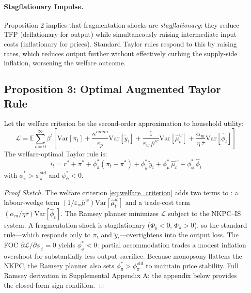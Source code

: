 \paragraph{Stagflationary Impulse.}
Proposition 2 implies that fragmentation shocks are \emph{stagflationary}: they
reduce TFP (deflationary for output) while simultaneously raising intermediate
input costs (inflationary for prices). Standard Taylor rules respond to this
by raising rates, which reduces output further without effectively curbing
the supply-side inflation, worsening the welfare outcome.

\subsection{Proposition 3: Optimal Augmented Taylor Rule}

\begin{theorem}
  \label{thm:optimal_rule}
  Let the welfare criterion be the second-order approximation to household
  utility:
  \begin{equation}
    \mathcal{L} = \mathbb{E}\sum_{t=0}^\infty\beta^t\left[
    \mathrm{Var}[\pi_t] + \frac{\kappa^{mono}}{\varepsilon_p}\mathrm{Var}[\tilde y_t]
    + \frac{1}{\varepsilon_w\,\bar\mu^w}\mathrm{Var}[\hat\mu_t^w]
    + \frac{\alpha_m}{\eta\,\bar\tau}\mathrm{Var}[\hat\phi_t]\right]
    \label{eq:welfare_criterion}
  \end{equation}
  The welfare-optimal Taylor rule is:
  \begin{equation}
    i_t = r^* + \pi^* + \phi_\pi^*(\pi_t-\pi^*) + \phi_y^*\,\tilde y_t
          + \phi_\mu^*\,\hat\mu_t^w + \phi_\phi^*\,\hat\phi_t
    \label{eq:optimal_rule}
  \end{equation}
  with $\phi_\pi^* > \phi_\pi^{std}$ and $\phi_\phi^* < 0$.
\end{theorem}

\begin{proof}[Proof Sketch]
  The welfare criterion \eqref{eq:welfare_criterion} adds two terms to
  \citet{woodford2003}: a labour-wedge term $(1/\varepsilon_w\bar\mu^w)\mathrm{Var}[\hat\mu^w_t]$
  and a trade-cost term $(\alpha_m/\eta\bar\tau)\mathrm{Var}[\hat\phi_t]$.
  The Ramsey planner minimizes $\mathcal{L}$ subject to the
  NKPC--IS system. A fragmentation shock is stagflationary ($\Phi_y < 0$,
  $\Phi_\pi > 0$), so the standard rule---which responds only to $\pi_t$ and
  $\tilde y_t$---overtightens into the output loss. The FOC
  $\partial\mathcal{L}/\partial\phi_\phi = 0$ yields $\phi_\phi^* < 0$:
  partial accommodation trades a modest inflation overshoot for substantially
  less output sacrifice. Because monopsony flattens the NKPC, the Ramsey
  planner also sets $\phi_\pi^* > \phi_\pi^{std}$ to maintain price stability.
  Full Ramsey derivation in Supplemental Appendix A; the appendix below
  provides the closed-form sign condition.
\end{proof}

